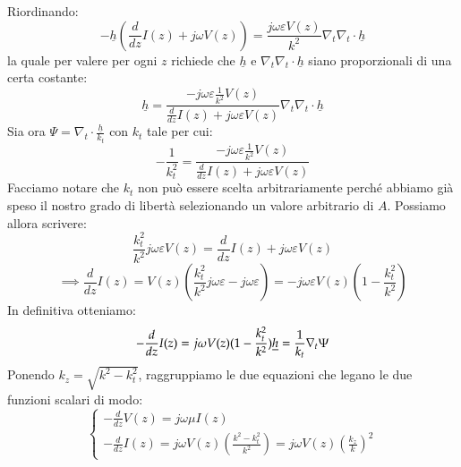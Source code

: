 \documentclass{book}
\begin{document}
        Riordinando:
        \begin{equation}
            -\underline{h}(\frac{d}{dz}I(z)+j\omega V(z))=\frac{j\omega \varepsilon V(z)}{k^{2}}\nabla_{t}\nabla_{t} \cdot \underline{h}
        \end{equation}
        la quale per valere per ogni $z$ richiede che $\underline{h}$ e $\nabla_{t}\nabla_{t} \cdot \underline{h}$ siano proporzionali di una certa costante:
        \begin{equation}
            \underline{h} = \frac{-j\omega \varepsilon \frac{1}{k^{2}}V(z)}{\frac{d}{dz}I(z)+j\omega \varepsilon V(z)} \nabla_{t} \nabla_{t} \cdot \underline{h}
        \end{equation}
        Sia ora $\Psi = \nabla_{t} \displaystyle \cdot \frac{\underline{h}}{k_{t}}$ con $k_{t}$ tale per cui:
        \begin{equation}
            -\frac{1}{k_{t} ^{2}} = \frac{-j\omega \varepsilon \frac{1}{k^{2}}V(z)}{\frac{d}{dz}I(z)+j\omega \varepsilon V(z)}
        \end{equation}
        Facciamo notare che $k_{t}$ non può essere scelta arbitrariamente perché abbiamo già speso il nostro grado di libertà selezionando un valore 
        arbitrario di $A$. Possiamo allora scrivere:
        \begin{equation}
            \frac{k_{t} ^{2}}{k^{2}}j \omega \varepsilon V(z) = \frac{d}{dz}I(z)+j \omega \varepsilon V(z)
        \end{equation}
        \begin{equation}
            \implies \frac{d}{dz}I(z) = V(z)(\frac{k_{t} ^{2}}{k^{2}}j \omega \varepsilon - j \omega \varepsilon) = -j \omega \varepsilon V(z)(1-\frac{k_{t} ^{2}}{k^{2}})
        \end{equation}
        In definitiva otteniamo:
        \begin{equation}
            \displaystyle - \frac{d}{dz}I(z) = j \omega V(z)(1-\frac{k_{t} ^{2}}{k^{2}}) \\
            \underline{h} = \frac{1}{k_{t}}\nabla_{t}\Psi
        \end{equation}
        Ponendo $k_{z} = \sqrt{k^{2}-k_{t} ^{2}}$, raggruppiamo le due equazioni che legano le due funzioni scalari di modo:
        \begin{equation}
            \begin{cases}
                \displaystyle -\frac{d}{dz}V(z) = j \omega \mu I(z) \\
                \displaystyle -\frac{d}{dz}I(z) = j \omega V(z)(\frac{k^{2}-k_{t} ^{2}}{k^{2}}) = j \omega V(z)(\frac{k_{z}}{k})^{2}
            \end{cases}
        \end{equation}
\end{document}
